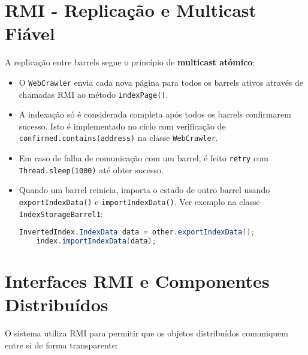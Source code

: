 \documentclass{article}
\begin{document}
\newpage
\section{RMI - Replicação e Multicast Fiável}

A replicação entre barrels segue o princípio de \textbf{multicast atómico}:
\begin{itemize} \item O \texttt{WebCrawler} envia cada nova página para todos os barrels ativos através de chamadas RMI ao método \texttt{indexPage()}.
\item A indexação só é considerada completa após todos os barrels confirmarem sucesso. Isto é implementado no ciclo com verificação de \texttt{confirmed.contains(address)} na classe \texttt{WebCrawler}.

\item Em caso de falha de comunicação com um barrel, é feito \texttt{retry} com \texttt{Thread.sleep(1000)} até obter sucesso.

\item Quando um barrel reinicia, importa o estado de outro barrel usando \texttt{exportIndexData()} e \texttt{importIndexData()}. Ver exemplo na classe \texttt{IndexStorageBarrel1}:
\begin{lstlisting}[language=Java, caption={Interface remota SearchService}]
    InvertedIndex.IndexData data = other.exportIndexData(); 
    index.importIndexData(data);
\end{lstlisting}
\end{itemize}













\newpage
\section{Interfaces RMI e Componentes Distribuídos}

O sistema utiliza RMI para permitir que os objetos distribuídos comuniquem entre si de forma transparente:
\end{document}
